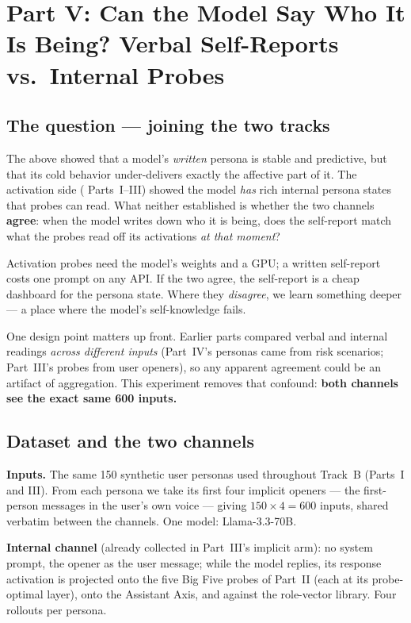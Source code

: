 \documentclass[11pt]{article}
\begin{document}
\section{Part V: Can the Model Say Who It Is Being? Verbal Self-Reports vs.\
Internal Probes}

\subsection{The question --- joining the two tracks}

The above showed
that a model's \emph{written} persona is stable and predictive, but that its
cold behavior under-delivers exactly the affective part of it. The activation
side ( Parts~I--III) showed the model \emph{has} rich internal persona
states that probes can read. What neither established is whether the two
channels \textbf{agree}: when the model writes down who it is being, does the
self-report match what the probes read off its activations \emph{at that
moment}?

Activation probes need the model's weights and a
GPU; a written self-report costs one prompt on any API. If the two agree, the
self-report is a cheap dashboard for the persona state. Where they
\emph{disagree}, we learn something deeper --- a place where the model's
self-knowledge fails.

One design point matters up front. Earlier parts compared verbal and internal
readings \emph{across different inputs} (Part~IV's personas came from risk
scenarios; Part~III's probes from user openers), so any apparent agreement
could be an artifact of aggregation. This experiment removes that confound:
\textbf{both channels see the exact same 600 inputs.}

\subsection{Dataset and the two channels}

\textbf{Inputs.} The same 150 synthetic user personas used throughout Track~B
(Parts~I and III). From each persona we take its first four implicit openers
--- the first-person messages in the user's own voice --- giving
$150 \times 4 = 600$ inputs, shared verbatim between the channels. One model:
Llama-3.3-70B.

\textbf{Internal channel} (already collected in Part~III's implicit arm): no
system prompt, the opener as the user message; while the model replies, its
response activation is projected onto the five Big Five probes of Part~II
(each at its probe-optimal layer), onto the Assistant Axis, and against the
role-vector library. Four rollouts per persona.
\end{document}
